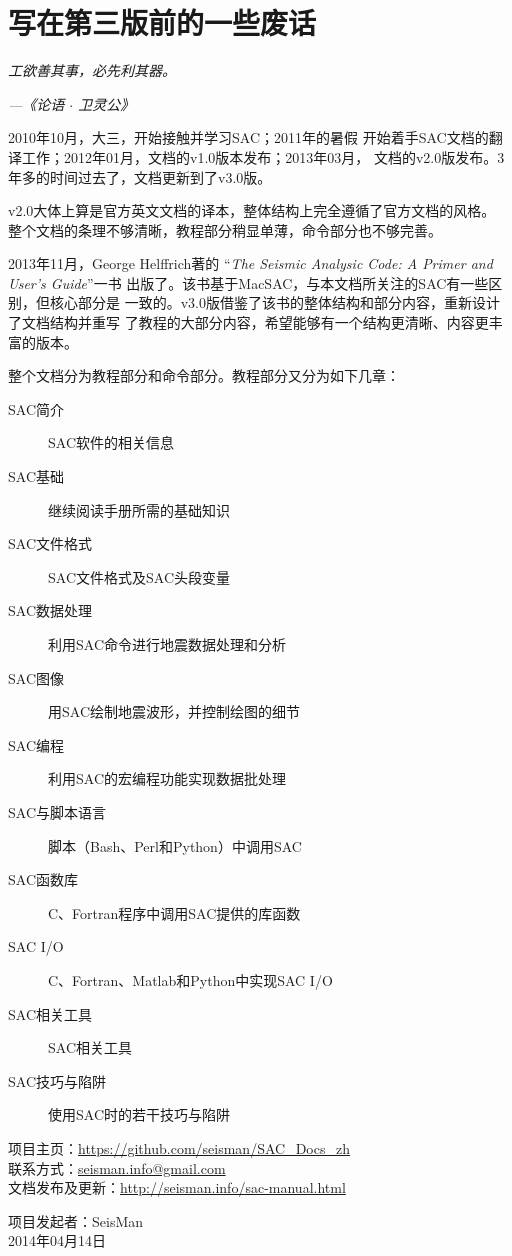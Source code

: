 {\section*{写在第三版前的一些废话}}

\begin{shadequote*}
\Large\emph{工欲善其事，必先利其器。}
\par\hfill\emph{\normalsize---《论语 $\cdot$ 卫灵公》}
\end{shadequote*}

2010年10月，大三，开始接触并学习SAC；2011年的暑假
开始着手SAC文档的翻译工作；2012年01月，文档的v1.0版本发布；2013年03月，
文档的v2.0版发布。3年多的时间过去了，文档更新到了v3.0版。

v2.0大体上算是官方英文文档的译本，整体结构上完全遵循了官方文档的风格。
整个文档的条理不够清晰，教程部分稍显单薄，命令部分也不够完善。

2013年11月，George Helffrich著的
``\emph{The Seismic Analysic Code: A Primer and User's Guide}''一书
出版了。该书基于MacSAC，与本文档所关注的SAC有一些区别，但核心部分是
一致的。v3.0版借鉴了该书的整体结构和部分内容，重新设计了文档结构并重写
了教程的大部分内容，希望能够有一个结构更清晰、内容更丰富的版本。

整个文档分为教程部分和命令部分。教程部分又分为如下几章：
\begin{description}
\item[SAC简介] SAC软件的相关信息
\item[SAC基础] 继续阅读手册所需的基础知识
\item[SAC文件格式] SAC文件格式及SAC头段变量
\item[SAC数据处理] 利用SAC命令进行地震数据处理和分析
\item[SAC图像] 用SAC绘制地震波形，并控制绘图的细节
\item[SAC编程] 利用SAC的宏编程功能实现数据批处理
\item[SAC与脚本语言] 脚本（Bash、Perl和Python）中调用SAC
\item[SAC函数库] C、Fortran程序中调用SAC提供的库函数
\item[SAC I/O] C、Fortran、Matlab和Python中实现SAC I/O
\item[SAC相关工具] SAC相关工具
\item[SAC技巧与陷阱] 使用SAC时的若干技巧与陷阱
\end{description}

\begin{flushleft}
项目主页：\url{https://github.com/seisman/SAC_Docs_zh}      \\
联系方式：\url{seisman.info@gmail.com}                      \\
文档发布及更新：\url{http://seisman.info/sac-manual.html}   \\
\end{flushleft}

\begin{flushright}
项目发起者：SeisMan \\
2014年04月14日
\end{flushright}
